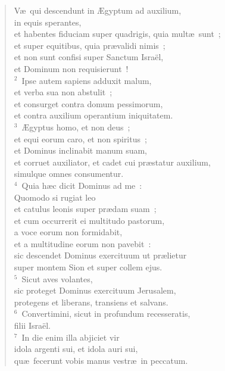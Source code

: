 \begin{flushleft}\begin{verse}\vspace{-19pt}\hspace{6pt}V\ae\ qui descendunt in \AE gyptum ad auxilium,\\\hspace{6pt} in equis sperantes,\\ et habentes fiduciam super quadrigis, quia mult\ae\ sunt~;\\ et super equitibus, quia pr\ae validi nimis~;\\ et non sunt confisi super Sanctum Isra\"el,\\ et Dominum non requisierunt~!\\
${}^{2}$~Ipse autem sapiens adduxit malum,\\ et verba sua non abstulit~;\\ et consurget contra domum pessimorum,\\ et contra auxilium operantium iniquitatem.\\
${}^{3}$~\AE gyptus homo, et non deus~;\\ et equi eorum caro, et non spiritus~;\\ et Dominus inclinabit manum suam,\\ et corruet auxiliator, et cadet cui pr\ae statur auxilium,\\ simulque omnes consumentur.\\
${}^{4}$~Quia h\ae c dicit Dominus ad me~:\\ Quomodo si rugiat leo\\ et catulus leonis super pr\ae dam suam~;\\ et cum occurrerit ei multitudo pastorum,\\ a voce eorum non formidabit,\\ et a multitudine eorum non pavebit~:\\ sic descendet Dominus exercituum ut pr\ae lietur\\ super montem Sion et super collem ejus.\\
${}^{5}$~Sicut aves volantes,\\ sic proteget Dominus exercituum Jerusalem,\\ protegens et liberans, transiens et salvans.\\
${}^{6}$~Convertimini, sicut in profundum recesseratis,\\ filii Isra\"el.\\
${}^{7}$~In die enim illa abjiciet vir\\ idola argenti sui, et idola auri sui,\\ qu\ae\ fecerunt vobis manus vestr\ae\ in peccatum.\\

\end{verse}
\end{flushleft}

